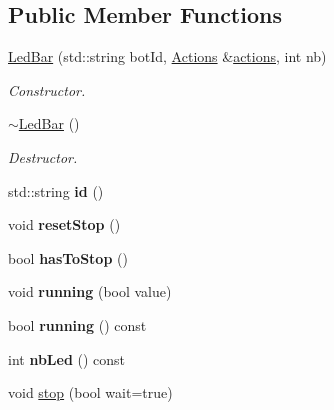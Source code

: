 \subsection*{Public Member Functions}
\begin{DoxyCompactItemize}
\item 
\hyperlink{classLedBar_a4f2e86893b6d174c1dd11a46c3dcf480}{Led\+Bar} (std\+::string bot\+Id, \hyperlink{classActions}{Actions} \&\hyperlink{classAActionsElement_a3fbd5b8201049a59602d8b7201a9ef8a}{actions}, int nb)
\begin{DoxyCompactList}\small\item\em Constructor. \end{DoxyCompactList}\item 
\mbox{\label{classLedBar_a8839ddd7f8500315818ab31d8b9aa0d9}} 
\hyperlink{classLedBar_a8839ddd7f8500315818ab31d8b9aa0d9}{$\sim$\+Led\+Bar} ()
\begin{DoxyCompactList}\small\item\em Destructor. \end{DoxyCompactList}\item 
\mbox{\label{classLedBar_a94f27bc744c6cfa97c2e9392c3b59182}} 
std\+::string {\bfseries id} ()
\item 
\mbox{\label{classLedBar_a6c7139e1a581510c85c11a318c7a0cf7}} 
void {\bfseries reset\+Stop} ()
\item 
\mbox{\label{classLedBar_ae24456e9bb03e44adff5e4d9b6efed59}} 
bool {\bfseries has\+To\+Stop} ()
\item 
\mbox{\label{classLedBar_a67de658c61e05e5b4d13f2c9bf8eb7ed}} 
void {\bfseries running} (bool value)
\item 
\mbox{\label{classLedBar_a2e77350f53c4579d7f71cc00d4f26dad}} 
bool {\bfseries running} () const
\item 
\mbox{\label{classLedBar_a15e2f8d21596686ea1a6938899fe4251}} 
int {\bfseries nb\+Led} () const
\item 
\mbox{\label{classLedBar_a0c1e129df2b8cec98a190bf3c9aa18d3}} 
void \hyperlink{classLedBar_a0c1e129df2b8cec98a190bf3c9aa18d3}{stop} (bool wait=true)

\end{DoxyCompactItemize}
